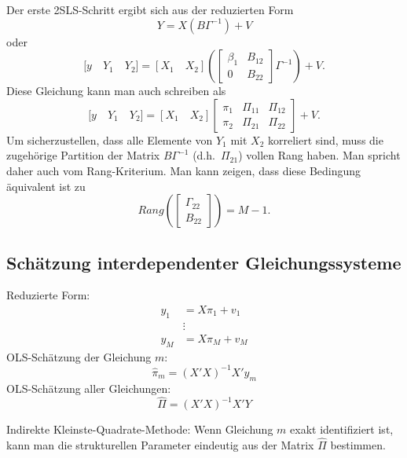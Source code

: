 \documentclass{article}
\begin{document}
Der erste 2SLS-Schritt ergibt sich aus der reduzierten Form
\[ Y=X\left( B\Gamma ^{-1}\right) +V \]
oder
\[
\lbrack y\quad Y_{1}\quad Y_{2}]=[X_{1}\quad X_{2}]\left( \left[ 
\begin{array}{cc}
\beta _{1} & B_{12} \\ 
0 & B_{22}%
\end{array}%
\right] \Gamma ^{-1}\right) +V. 
\]%
Diese Gleichung kann man auch schreiben als
\[
\lbrack y\quad Y_{1}\quad Y_{2}]=[X_{1}\quad X_{2}]\left[ 
\begin{array}{ccc}
\pi _{1} & \Pi _{11} & \Pi _{12} \\ 
\pi _{2} & \Pi _{21} & \Pi _{22}%
\end{array}%
\right] +V. 
\]%
Um sicherzustellen, dass alle Elemente von $Y_{1}$ mit $X_{2}$
korreliert sind, muss die zugehörige Partition der Matrix
$B\Gamma ^{-1}$ (d.h.\ $\Pi _{21}$) vollen Rang haben.
Man spricht daher auch vom Rang-Kriterium. Man kann zeigen,
dass diese Bedingung äquivalent ist zu
\[
Rang\left( \left[ 
\begin{array}{c}
\Gamma _{22} \\ 
B_{22}%
\end{array}%
\right] \right) =M-1. 
\]

\subsection*{Schätzung interdependenter Gleichungssysteme}

Reduzierte Form:
\begin{align*}
y_{1} &=X\pi_{1}+v_{1} \\
&\vdots \\
y_{M} &=X\pi_{M}+v_{M}
\end{align*}
OLS-Schätzung der Gleichung $m$:
\[ \hat{\pi}_{m}=(X'X)^{-1}X'y_{m} \]
OLS-Schätzung aller Gleichungen:
\[ \hat{\Pi}=(X'X)^{-1}X'Y \]

Indirekte Kleinste-Quadrate-Methode: Wenn Gleichung $m$ exakt
identifiziert ist, kann man die strukturellen Parameter
eindeutig aus der Matrix $\hat\Pi$ bestimmen.
\end{document}

